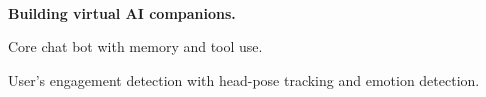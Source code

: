 \\
\vspace{-.2em}
\begin{xitemize}
    \item \textbf{Building virtual AI companions.}
    \begin{zitemize}
        \item Core chat bot with memory and tool use.
        \item User's engagement detection with head-pose tracking and emotion detection.
    \end{zitemize}
\end{xitemize}

\\
